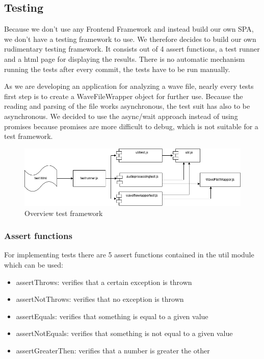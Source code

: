 \subsection{Testing}\label{subsec:testing}
Because we don't use any Frontend Framework and instead build our own SPA, we don't have a testing framework to use.
We therefore decides to build
our own rudimentary testing framework.
It consists out of 4 assert functions, a test runner and a html page for displaying the results.
There is no automatic mechanism running the tests after every commit, the tests have to be run manually.

As we are developing an application for analyzing a wave file, nearly every tests first step is to create a WaveFileWrapper object for further use.
Because the reading and parsing of the file works asynchronous, the test suit has also to be asynchronous.
We decided to use the async/wait approach instead of using promises because promises are more difficult to debug, which is not suitable for a test framework.

\begin{figure}[H]
    \centering
    \includegraphics[width=\textwidth]{../assets/overview_test_framework.png}
    \caption{Overview test framework}\label{fig:overview-test-framework}
\end{figure}

\subsubsection{Assert functions}
For implementing tests there are 5 assert functions contained in the util module which can be used:

\begin{itemize}
    \item assertThrows: verifies that a certain exception is thrown
    \item assertNotThrows: verifies that no exception is thrown
    \item assertEquals: verifies that something is equal to a given value
    \item assertNotEquals: verifies that something is not equal to a given value
    \item assertGreaterThen: verifies that a number is greater the other
\end{itemize}

